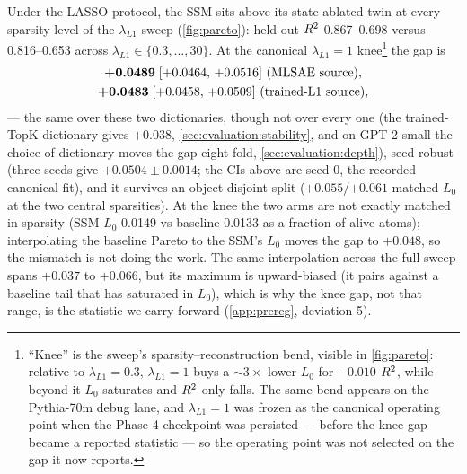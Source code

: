 Under the LASSO protocol, the SSM sits above its state-ablated twin at every
sparsity level of the $\lambda_{L1}$ sweep (\cref{fig:pareto}): held-out
$R^2$ 0.867--0.698 versus 0.816--0.653 across $\lambda_{L1} \in
\{0.3,\dots,30\}$. At the canonical $\lambda_{L1}{=}1$
knee\footnote{``Knee'' is the sweep's sparsity--reconstruction bend, visible
in \cref{fig:pareto}: relative to $\lambda_{L1}{=}0.3$, $\lambda_{L1}{=}1$
buys a ${\sim}3\times$ lower $L_0$ for $-0.010$ $R^2$, while beyond it $L_0$
saturates and $R^2$ only falls. The same bend appears on the Pythia-70m
debug lane, and $\lambda_{L1}{=}1$ was frozen as the canonical operating
point when the Phase-4 checkpoint was persisted --- before the knee gap
became a reported statistic --- so the operating point was not selected on
the gap it now reports.} the gap is
\begin{gather*}
  \textbf{+0.0489}\; [+0.0464,\,+0.0516] \text{ (MLSAE source)},\\
  \textbf{+0.0483}\; [+0.0458,\,+0.0509] \text{ (trained-L1 source)},
\end{gather*}
--- the same over these two dictionaries, though not over every one (the
trained-TopK dictionary gives $+0.038$, \cref{sec:evaluation:stability}, and
on GPT-2-small the choice of dictionary moves the gap eight-fold,
\cref{sec:evaluation:depth}), seed-robust (three seeds give
$+0.0504 \pm 0.0014$; the CIs above are seed 0, the recorded canonical fit),
and it survives an object-disjoint split
($+0.055$/$+0.061$ matched-$L_0$ at the two central sparsities). At the knee
the two arms are not exactly matched in sparsity (SSM $L_0$ 0.0149 vs baseline
0.0133 as a fraction of alive atoms); interpolating the baseline Pareto to the
SSM's $L_0$ moves the gap to $+0.048$, so the mismatch is not doing the work.
The same interpolation across the full sweep spans $+0.037$ to $+0.066$, but
its maximum is upward-biased (it pairs against a baseline tail that has
saturated in $L_0$), which is why the knee gap, not that range, is the
statistic we carry forward (\cref{app:prereg}, deviation 5).

